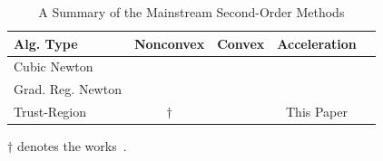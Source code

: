 \documentclass{article}
\theoremstyle{plain}
\theoremstyle{definition}
\theoremstyle{remark}
\begin{document}
\begin{table}[t]
    \caption{A Summary of the Mainstream Second-Order Methods}
    \label{table.summary}
    \vskip 0.15in
    \begin{center}
        \begin{small}
            \begin{sc}
                \begin{tabular}{lcccr}
                    \toprule
                    Alg. Type         & Nonconvex                 & Convex                                                  & Acceleration                     \\
                    \midrule
                    Cubic Newton      & \citet{nesterov2006cubic} & \citet{nesterov2006cubic}                               & \citet{nesterov2008accelerating} \\
                    Grad. Reg. Newton & \citet{gratton2023yet}    & \citet{mishchenko_regularized_2023}                     & \citet{doikov2020contracting}    \\
                    Trust-Region      & $\dagger$                 & \citet{jiang2024nonconvexityuniversaltrustregionmethod} & This Paper                       \\
                    \bottomrule
                \end{tabular}
            \end{sc}
        \end{small}
    \end{center}
    \vskip -0.1in
    \begin{tablenotes}
        \small
        \item $\dagger$ denotes the works~\cite{curtis2017trust,curtis2021trust,luenberger_linear_2021,hamad2022consistently,hamad2024simplepracticaladaptivetrustregion,jiang2024nonconvexityuniversaltrustregionmethod}.
    \end{tablenotes}
\end{table}
\end{document}
